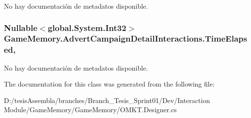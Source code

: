 No hay documentación de metadatos disponible. 

\hypertarget{class_game_memory_1_1_advert_campaign_detail_interactions_ae756a263996a18752f44e5928792bf7a}{
\subsubsection[{Time\-Elapsed}]{\setlength{\rightskip}{0pt plus 5cm}Nullable$<$global.\-System.\-Int32$>$ Game\-Memory.\-Advert\-Campaign\-Detail\-Interactions.\-Time\-Elapsed\hspace{0.3cm}{\ttfamily [get]}, {\ttfamily [set]}}}\label{class_game_memory_1_1_advert_campaign_detail_interactions_ae756a263996a18752f44e5928792bf7a}


No hay documentación de metadatos disponible. 



The documentation for this class was generated from the following file\-:\begin{DoxyCompactItemize}
\item 
D\-:/tesis\-Assembla/branches/\-Branch\-\_\-\-Tesis\-\_\-\-Sprint01/\-Dev/\-Interaction Module/\-Game\-Memory/\-Game\-Memory/O\-M\-K\-T.\-Designer.\-cs\end{DoxyCompactItemize}
